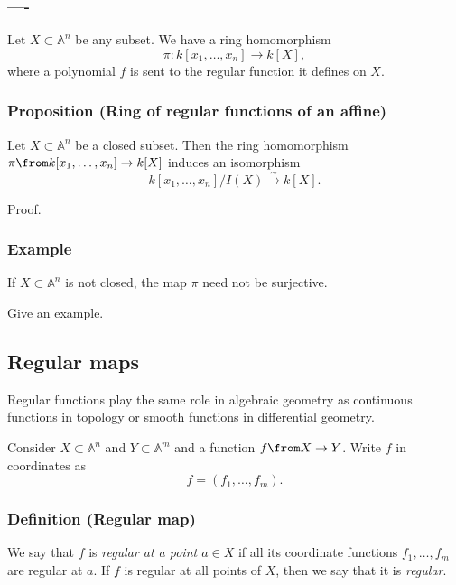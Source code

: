 \documentclass[11pt]{article}
\begin{document}
\subsubsection*{----}
\label{sec:org32153de}
Let \(X \subset \mathbb A^n\) be any subset.
We have a ring homomorphism
\[ \pi \colon k[x_1,\dots,x_n] \to k[X],\]
where a polynomial \(f\) is sent to the regular function it defines on \(X\).

\subsubsection{Proposition (Ring of regular functions of an affine)}
\label{sec:org0a3f246}
Let \(X \subset \mathbb A^n\) be a closed subset.
Then the ring homomorphism \(\pi \from k[x_1,\dots,x_n] \to k[X]\) induces an isomorphism
\[ k[x_1,\dots,x_n]/I(X) \xrightarrow{\sim} k[X].\]
\begin{skipped}
Proof.
\end{skipped}

\subsubsection{Example}
\label{sec:org9d11a44}
If \(X \subset \mathbb A^n\) is not closed, the map \(\pi\) need not be surjective.
\begin{skipped}
Give an example.
\end{skipped}

\subsection{Regular maps}
\label{sec:orga3ce42e}
Regular functions play the same role in algebraic geometry as continuous functions in topology or smooth functions in differential geometry.

Consider \(X \subset \mathbb A^n\) and \(Y \subset \mathbb A^m\) and a function \(f \from X \to Y\).
Write \(f\) in coordinates as
\[ f = (f_1, \dots, f_m).\]

\subsubsection{Definition (Regular map)}
\label{sec:org4fdf04c}
We say that \(f\) is \emph{regular at a point \(a \in X\)} if all its  coordinate functions \(f_1, \dots, f_m\) are regular at \(a\).
If \(f\) is regular at all points of \(X\), then we say that it is \emph{regular}.
\end{document}
